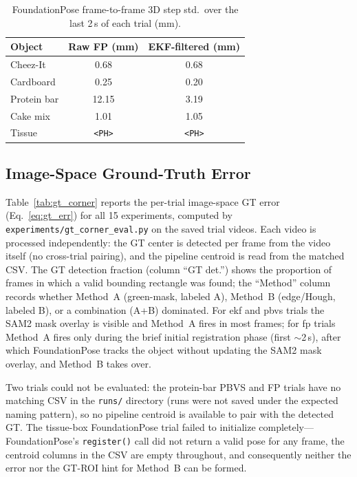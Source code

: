 \documentclass[letterpaper, 10 pt, conference]{ieeeconf}  %
\begin{document}
\begin{table}[h]
\centering
\caption{FoundationPose frame-to-frame 3D step std.\ over the last 2\,s of each trial (mm).}
\label{tab:fp_jitter}
\footnotesize
\begin{tabular}{@{}lcc@{}}
\toprule
Object & Raw FP (mm) & EKF-filtered (mm) \\
\midrule
Cheez-It    & 0.68  & 0.68 \\
Cardboard   & 0.25  & 0.20 \\
Protein bar & 12.15 & 3.19 \\
Cake mix    & 1.01  & 1.05 \\
Tissue      & \texttt{<PH>} & \texttt{<PH>} \\
\bottomrule
\end{tabular}
\end{table}


\subsection{Image-Space Ground-Truth Error}

Table~\ref{tab:gt_corner} reports the per-trial image-space GT error (Eq.~\ref{eq:gt_err}) for all 15 experiments, computed by \texttt{experiments/gt\_corner\_eval.py} on the saved trial videos. Each video is processed independently: the GT center is detected per frame from the video itself (no cross-trial pairing), and the pipeline centroid is read from the matched CSV. The GT detection fraction (column ``GT det.'') shows the proportion of frames in which a valid bounding rectangle was found; the ``Method'' column records whether Method~A (green-mask, labeled A), Method~B (edge/Hough, labeled B), or a combination (A+B) dominated. For ekf and pbvs trials the SAM2 mask overlay is visible and Method~A fires in most frames; for fp trials Method~A fires only during the brief initial registration phase (first $\sim$2\,s), after which FoundationPose tracks the object without updating the SAM2 mask overlay, and Method~B takes over.

Two trials could not be evaluated: the protein-bar PBVS and FP trials have no matching CSV in the \texttt{runs/} directory (runs were not saved under the expected naming pattern), so no pipeline centroid is available to pair with the detected GT. The tissue-box FoundationPose trial failed to initialize completely---FoundationPose's \texttt{register()} call did not return a valid pose for any frame, the centroid columns in the CSV are empty throughout, and consequently neither the error nor the GT-ROI hint for Method~B can be formed.
\end{document}
